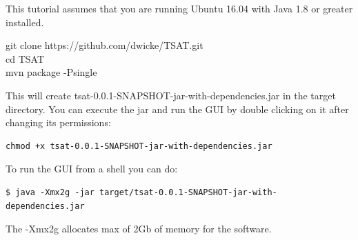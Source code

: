 \documentclass[letterpaper, 12pt]{article}
\newenvironment{allintypewriter}{\ttfamily}{\par}
\begin{document}
This tutorial assumes that you are running Ubuntu 16.04 with Java 1.8 or greater installed.

\begin{allintypewriter}
	\noindent git clone https://github.com/dwicke/TSAT.git\\
	cd TSAT\\
	mvn package -Psingle\\
\end{allintypewriter}
This will create tsat-0.0.1-SNAPSHOT-jar-with-dependencies.jar in the target directory.  You can execute the jar and run the GUI by double clicking on it after changing its permissions:
\begin{verbatim}
chmod +x tsat-0.0.1-SNAPSHOT-jar-with-dependencies.jar
\end{verbatim}  


To run the GUI from a shell you can do:
\begin{verbatim}
$ java -Xmx2g -jar target/tsat-0.0.1-SNAPSHOT-jar-with-dependencies.jar 
\end{verbatim}

The -Xmx2g allocates max of 2Gb of memory for the software.





\end{document}

